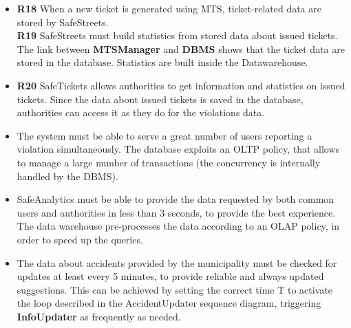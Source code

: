 \documentclass[./main.tex]{subfiles}
\begin{document}

\begin{itemize}
\item
  \textbf{R18} When a new ticket is generated using MTS, ticket-related
  data are stored by SafeStreets.\\
  \textbf{R19} SafeStreets must build statistics from stored data about
  issued tickets.
  \subitem
    The link between \textbf{MTSManager} and \textbf{DBMS} shows that the ticket data are stored in the database. Statistics are built inside the Datawarehouse.

\item
  \textbf{R20} SafeTickets allows authorities to get information and
  statistics on issued tickets.
  \subitem
    Since the data about issued tickets is saved in the database, authorities can access it as they do for the violations data.
\end{itemize}

\begin{itemize}
\item
  The system must be able to serve a great number of users reporting a
  violation simultaneously.
  \subitem
  	The database exploits an OLTP policy, that allows to manage a large number of transactions (the concurrency is internally handled by the DBMS).
\item
  SafeAnalytics must be able to provide the data requested by both
  common users and authorities in less than 3 seconds, to provide the
  best experience.
  \subitem 
  	The data warehouse pre-processes the data according to an OLAP policy, in order to speed up the queries.
\item
  The data about accidents provided by the municipality must be checked
  for updates at least every 5 minutes, to provide reliable and always
  updated suggestions.
  \subitem
    This can be achieved by setting the correct time T to activate the loop described in the AccidentUpdater sequence diagram, triggering \textbf{InfoUpdater} as frequently as needed.
\end{itemize}
\end{document}
